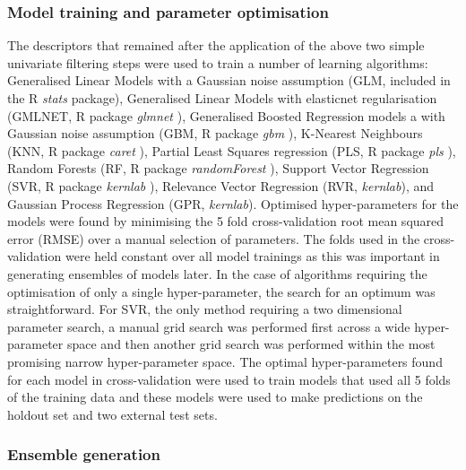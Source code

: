 \documentclass[10pt]{bmc_article}
\newenvironment{bmcformat}{\begin{raggedright}\baselineskip20pt\sloppy\setboolean{publ}{false}}{\end{raggedright}\baselineskip20pt\sloppy}
\begin{document}
\begin{bmcformat}
\subsubsection*{Model training and parameter optimisation}
The descriptors that remained after the application of the above two simple univariate filtering steps were used to train a number of learning algorithms:	 Generalised Linear Models with a Gaussian noise assumption (GLM, included in the R \textit{stats} package), Generalised Linear Models with elasticnet regularisation (GMLNET, R package \textit{glmnet} \cite{friedman_regularization_2010}), Generalised Boosted Regression models a with Gaussian noise assumption (GBM, R package \textit{gbm} \cite{gbm}), K-Nearest Neighbours (KNN, R package \textit{caret} \cite{Kuhn2008}), Partial Least Squares regression (PLS, R package \textit{pls} \cite{pls}), Random Forests (RF, R package \textit{randomForest} \cite{randomForest}), Support Vector Regression (SVR, R package \textit{kernlab} \cite{kernlab}), Relevance Vector Regression (RVR, \textit{kernlab}), and Gaussian Process Regression (GPR, \textit{kernlab}).  Optimised hyper-parameters for the models were found by minimising the 5 fold cross-validation root mean squared error (RMSE) over a manual selection of parameters. The folds used in the cross-validation were held constant over all model trainings as this was important in generating ensembles of models later. In the case of algorithms requiring the optimisation of only a single hyper-parameter, the search for an optimum was straightforward. For SVR, the only method requiring a two dimensional parameter search, a manual grid search was performed first across a wide hyper-parameter space and then another grid search was performed within the most promising narrow hyper-parameter space. The optimal hyper-parameters found for each model in cross-validation were used to train models that used all 5 folds of the training data and these models were used to make predictions on the holdout set and two external test sets.

\subsubsection*{Ensemble generation}


\end{bmcformat}
\end{document}

